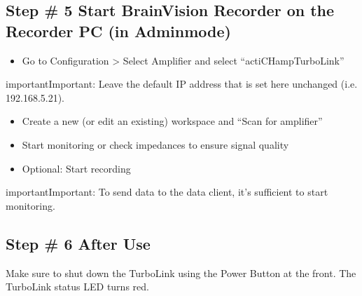 \documentclass[letterpaper,10pt,english]{sphinxmanual}
\begin{document}
\begin{figure}[htbp]
\centering

\noindent{}
\end{figure}

\begin{figure}[htbp]
\centering

\noindent{}
\end{figure}


\subsection{Step \# 5 \sphinxhyphen{} Start BrainVision Recorder on the Recorder PC (in Admin\sphinxhyphen{}mode)}
\label{\detokenize{3_setup_biosignal_amplifier:step-5-start-brainvision-recorder-on-the-recorder-pc-in-admin-mode}}\begin{itemize}
\item {} 
\sphinxAtStartPar
Go to Configuration \textgreater{} Select Amplifier and select “actiCHamp\sphinxhyphen{}TurboLink”

\end{itemize}

\begin{sphinxadmonition}{important}{Important:}
\sphinxAtStartPar
Leave the default IP address that is set here unchanged (i.e. 192.168.5.21).
\end{sphinxadmonition}
\begin{itemize}
\item {} 
\sphinxAtStartPar
Create a new (or edit an existing) workspace and “Scan for amplifier”

\item {} 
\sphinxAtStartPar
Start monitoring or check impedances to ensure signal quality

\item {} 
\sphinxAtStartPar
Optional: Start recording

\end{itemize}

\begin{sphinxadmonition}{important}{Important:}
\sphinxAtStartPar
To send data to the data client, it’s sufficient to start monitoring.
\end{sphinxadmonition}


\subsection{Step \# 6 \sphinxhyphen{} After Use}
\label{\detokenize{3_setup_biosignal_amplifier:step-6-after-use}}
\sphinxAtStartPar
Make sure to shut down the TurboLink using the Power Button at the front. The TurboLink status LED turns red.
\end{document}
